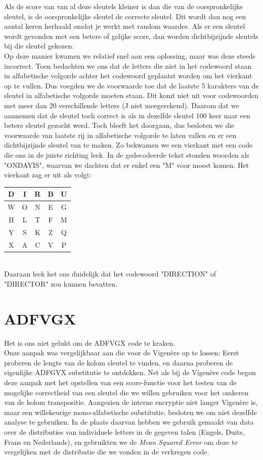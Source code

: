 \documentclass[fleqn]{article}
\begin{document}
	Als de score van van al deze sleutels kleiner is dan die van de oorspronkelijke sleutel, is de oorspronkelijke sleutel de correcte sleutel. Dit wordt dan nog een aantal keren herhaald omdat je werkt met random waardes. Als er een sleutel wordt gevonden met een betere of gelijke score, dan worden dichtbijzijnde sleutels bij die sleutel gekozen.\\
	Op deze manier kwamen we relatief snel aan een oplossing, maar was deze steeds incorrect. Toen bedachten we ons dat de letters die niet in het codewoord staan in alfabetische volgorde achter het codewoord geplaatst worden om het vierkant op te vullen. Dus voegden we de voorwaarde toe dat de laatste 5 karakters van de sleutel in alfabetische volgorde moeten staan. Dit komt niet uit voor codewoorden met meer dan 20 verschillende letters (J niet meegerekend). Daarom dat we aannemen dat de sleutel toch correct is als in dezelfde sleutel 100 keer naar een betere sleutel gezocht werd. Toch bleeft het doorgaan, dus besloten we die voorwaarde van laatste rij in alfabetische volgorde te laten vallen en er een dichtbijzijnde sleutel van te maken. Zo bekwamen we een vierkant met een code die ons in de juiste richting leek. In de gedecodeerde tekst stonden woorden als "ONDAYIS", waarvan we dachten dat er enkel een "M" voor moest komen. Het vierkant zag er uit als volgt:
	\\
	\begin{tabular}{|c|c|c|c|c|}
		\hline 
		D & I & R & B & U \\ 
		\hline 
		W & O & N & E & G \\ 
		\hline 
		H & L & T & F & M \\ 
		\hline 
		Y & S & K & Z & Q \\ 
		\hline 
		X & A & C & V & P \\ 
		\hline 
	\end{tabular} 
	\\
	Daaraan leek het ons duidelijk dat het codewoord "DIRECTION" of "DIRECTOR" zou kunnen bevatten.
	\section{ADFVGX}
	Het is ons niet gelukt om de ADFVGX code te kraken.\\
	Onze aanpak was vergelijkbaar aan die voor de Vigen\`ere op te lossen: Eerst proberen de lengte van de kolom sleutel te vinden, en daarna proberen de eigenlijke ADFGVX substitutie te ontdekken. Net als bij de Vigen\`ere code begon deze aanpak met het opstellen van een score-functie voor het testen van de mogelijke correctheid van een sleutel die we willen gebruiken voor het omkeren van de kolom transpositie. Aangezien de interne encryptie niet langer Vigen\`ere is, maar een willekeurige mono-alfabetische substitutie, besloten we om niet dezelfde analyse te gebruiken. In de plaats daarvan hebben we gebruik gemaakt van data over de distributies van individuele letters in de gegeven talen (Engels, Duits, Frans en Nederlands), en gebruikten we de \textit{Mean Squared Error} om deze te vergelijken met de distributie die we vonden in de verkregen code.
	
\end{document}

